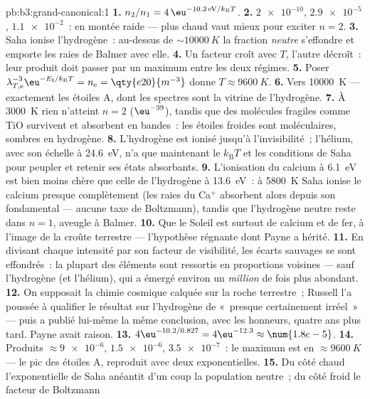 \begin{solution}{pb:b3:grand-canonical:1}
\textbf{1.} $n_2/n_1 = 4\,\eu^{-10.2\,\text{eV}/k_{\text{B}}T}$.
\textbf{2.} $\num{2e-10}$, $\num{2.9e-5}$, $\num{1.1e-2}$~: en
montée raide --- plus chaud vaut mieux pour exciter $n = 2$.
\textbf{3.} Saha ionise l'hydrogène~: au-dessus de
$\sim\qty{10000}{K}$ la fraction \emph{neutre} s'effondre et
emporte les raies de Balmer avec elle.
\textbf{4.} Un facteur croît avec $T$, l'autre décroît~: leur
produit doit passer par un maximum entre les deux régimes.
\textbf{5.} Poser $\lambda_{T,\text{e}}^{-3}\eu^{-E_{\text{I}}/
k_{\text{B}}T} = n_{\text{e}} = \qty{e20}{m^{-3}}$ donne $T
\approx \qty{9600}{K}$.
\textbf{6.} Vers \qty{10000}{K} --- exactement les étoiles A, dont
les spectres sont la vitrine de l'hydrogène.
\textbf{7.} À \qty{3000}{K} rien n'atteint $n = 2$
($\eu^{-39}$), tandis que des molécules fragiles comme TiO
survivent et absorbent en bandes~: les étoiles froides sont
moléculaires, sombres en hydrogène.
\textbf{8.} L'hydrogène est ionisé jusqu'à l'invisibilité~;
l'hélium, avec son échelle à \qty{24.6}{eV}, n'a que maintenant le
$k_{\text{B}}T$ et les conditions de Saha pour peupler et retenir
ses états absorbants.
\textbf{9.} L'ionisation du calcium à \qty{6.1}{eV} est bien moins
chère que celle de l'hydrogène à \qty{13.6}{eV}~: à \qty{5800}{K}
Saha ionise le calcium presque complètement (les raies du Ca$^+$
absorbent alors depuis son fondamental --- aucune taxe de
Boltzmann), tandis que l'hydrogène neutre reste dans $n = 1$,
aveugle à Balmer.
\textbf{10.} Que le Soleil est surtout de calcium et de fer, à
l'image de la croûte terrestre --- l'hypothèse régnante dont Payne
a hérité.
\textbf{11.} En divisant chaque intensité par son facteur de
visibilité, les écarts sauvages se sont effondrés~: la plupart des
éléments sont ressortis en proportions voisines --- sauf
l'hydrogène (et l'hélium), qui a émergé environ un \emph{million}
de fois plus abondant.
\textbf{12.} On supposait la chimie cosmique calquée sur la roche
terrestre~; Russell l'a poussée à qualifier le résultat sur
l'hydrogène de «~presque certainement irréel~» --- puis a publié
lui-même la même conclusion, avec les honneurs, quatre ans plus
tard. Payne avait raison.
\textbf{13.} $4\eu^{-10.2/0.827} = 4\eu^{-12.3} \approx
\num{1.8e-5}$.
\textbf{14.} Produits $\approx \num{9e-6}$, $\num{1.5e-6}$,
$\num{3.5e-7}$~: le maximum est en $\approx\qty{9600}{K}$ --- le
pic des étoiles A, reproduit avec deux exponentielles.
\textbf{15.} Du côté chaud l'exponentielle de Saha anéantit d'un
coup la population neutre~; du côté froid le facteur de Boltzmann

\end{solution}
